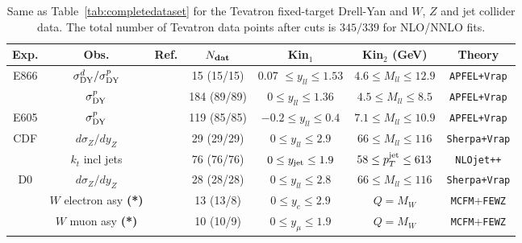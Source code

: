\begin{table}
\footnotesize
\begin{centering}
    \renewcommand{\arraystretch}{1.4}
\begin{tabular}{|c|c|c|c|c|c|c|}
\hline
{Exp.} & Obs. & {Ref.}  & $ N_{\rm \bf dat}$ & Kin$_1$  & Kin$_2$ (GeV) & Theory \tabularnewline
\hline
\hline
\multirow{2}{*}{E866} &   $\sigma_{\rm DY}^d/\sigma_{\rm DY}^p$ & \cite{Towell:2001nh} & 15 (15/15)
& 0.07 $\le y_{ll}\le 1.53$ &
$ 4.6 \le M_{ll}\le 12.9 $  & {\tt APFEL+Vrap}\tabularnewline
&  $\sigma_{\rm DY}^p$ & \cite{Webb:2003ps,Webb:2003bj} & 184 (89/89) & $0 \le y_{ll}\le 1.36 $ &
$  4.5 \le M_{ll}\le 8.5 $  &{\tt APFEL+Vrap} \tabularnewline
 \hline
 E605 & $\sigma_{\rm DY}^p$ &  \cite{Moreno:1990sf} & 119 (85/85) & $ -0.2 \le y_{ll}\le 0.4$ &
 $ 7.1 \le M_{ll}\le 10.9 $  & {\tt APFEL+Vrap} \tabularnewline
 \hline
\multirow{2}{*}{CDF} &   $d\sigma_Z/dy_Z$ & \cite{Aaltonen:2010zza}&  29 (29/29)  & $ 0 \le y_{ll}\le 2.9 $  & $66 \le M_{ll}\le 116$   &{\tt Sherpa+Vrap} \tabularnewline
&  $k_t$ incl jets & \cite{Abulencia:2007ez} & 76 (76/76) & $ 0\le y_{\rm jet}\le 1.9$  &
 $ 58 \le p_T^{\rm jet}\le 613$  &{\tt NLOjet++} \tabularnewline
\hline
\multirow{3}{*}{D0}   &   $d\sigma_Z/dy_Z$ &  \cite{Abazov:2007jy}  & 28 (28/28) & $0 \le y_{ll}\le 2.8 $ &
 $66 \le M_{ll}\le 116$ & {\tt Sherpa+Vrap}\tabularnewline
&   $W$ electron asy {\bf (*)}  & \cite{D0:2014kma}  & 13  (13/8) &  $0 \le y_{e}\le 2.9 $& $Q=M_W$  &{\tt MCFM}+{\tt FEWZ}\tabularnewline
 &   $W$ muon asy {\bf (*)}  & \cite{Abazov:2013rja}  &  10 (10/9)   & $0 \le y_{\mu}\le 1.9 $ & $Q=M_W$ & {\tt MCFM}+{\tt FEWZ}\tabularnewline
  \hline
\end{tabular}
\par\end{centering}
\caption{\small Same as Table~\ref{tab:completedataset}
  for the Tevatron fixed-target Drell-Yan  and $W$, $Z$ and jet collider
  data. The total number of Tevatron data points after cuts is $345/339$ 
for NLO/NNLO fits.
\label{tab:completedataset2}
}
\end{table}


